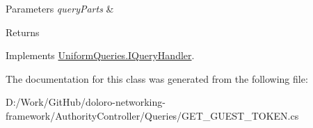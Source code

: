 \begin{DoxyParams}{Parameters}
{\em query\+Parts} & \\
\hline
\end{DoxyParams}
\begin{DoxyReturn}{Returns}

\end{DoxyReturn}


Implements \mbox{\hyperlink{interface_uniform_queries_1_1_i_query_handler_abda1ccf47ad2889fbd015955965046e7}{Uniform\+Queries.\+I\+Query\+Handler}}.



The documentation for this class was generated from the following file\+:\begin{DoxyCompactItemize}
\item 
D\+:/\+Work/\+Git\+Hub/doloro-\/networking-\/framework/\+Authority\+Controller/\+Queries/G\+E\+T\+\_\+\+G\+U\+E\+S\+T\+\_\+\+T\+O\+K\+E\+N.\+cs\end{DoxyCompactItemize}
